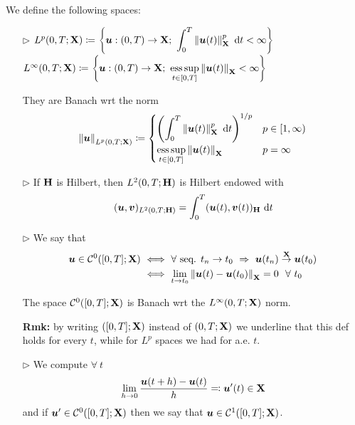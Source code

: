 We define the following spaces:
\begin{itemize}
    \item[$\triangleright$] $L^p(0,T;\mathbf{X})\coloneq \left\{ \bm u:(0,T)\to \mathbf{X};\ \displaystyle\int_0^T \left\lVert \bm u(t) \right\rVert_{\mathbf{X}}^{p} \  \mathrm{d} t<\infty \right\}$ \\
    $L^\infty(0,T;\mathbf{X})\coloneq \left\{ \bm u:(0,T)\to \mathbf{X};\ \displaystyle\operatorname*{ess\,sup}_{t\in[0,T]} \left\lVert \bm u(t) \right\rVert_{\mathbf{X}}<\infty \right\}$  

    They are Banach wrt the norm
    \begin{equation*}
    \left\lVert \bm u \right\rVert_{L^p(0,T;\mathbf{X})}\coloneq
    \begin{cases}
    \displaystyle \left( \int_0^T \left\lVert \bm u(t) \right\rVert_{\mathbf{X}}^p \  \mathrm{d} t \right)^{1/p} & p\in [1,\infty) \\
    \displaystyle\operatorname*{ess\,sup}_{t\in [0,T]} \left\lVert \bm u(t) \right\rVert_{\mathbf{X}} &p=\infty
    \end{cases}
    \end{equation*}

    \item[$\triangleright$] If $\mathbf{H}$ is Hilbert, then $L^2(0,T;\mathbf{H})$ is Hilbert endowed with
    \begin{equation*}
    (\bm u,\bm v)_{L^2(0,T;\mathbf{H})}=\int_0^T (\bm u(t), \bm v(t))_{\mathbf{H}} \  \mathrm{d} t
    \end{equation*}

    \vspace{-1em}

    \item[$\triangleright$] We say that
    \begin{align*}
    \bm u \in \mathcal{C}^0([0,T];\mathbf{X}) &\ \Longleftrightarrow \ \forall \text{ seq. }t_n\to t_0\ \Rightarrow\ \bm u(t_n)\overset{\mathbf{X}}{\to} \bm u(t_0) \\
    &\ \Longleftrightarrow \ \lim_{t\to t_0} \left\lVert \bm u(t)-\bm u(t_0) \right\rVert_{\mathbf{X}}=0\ \ \forall\ t_0
    \end{align*}

    \vspace{-0.5em}

    The space $ \mathcal{C}^0([0,T];\mathbf{X})$ is Banach wrt the $L^\infty(0,T;\mathbf{X})$ norm.

    \smallskip

    \textbf{Rmk:} by writing $([0,T];\mathbf{X})$ instead of $(0,T;\mathbf{X})$ we underline that this def holds for every $t$, while for $L^p$ spaces we had for a.e. $t$.

    \item[$\triangleright$] We compute $\forall\ t$
    \begin{equation*}
    \lim_{h\to 0} \frac{\bm u(t+h)-\bm u(t)}{h}\eqcolon \bm u'(t) \in \mathbf{X}
    \end{equation*}
    and if $\bm u'\in \mathcal{C}^0([0,T];\mathbf{X})$ then we say that $\bm u\in  \mathcal{C}^1([0,T];\mathbf{X})$.


\end{itemize}
